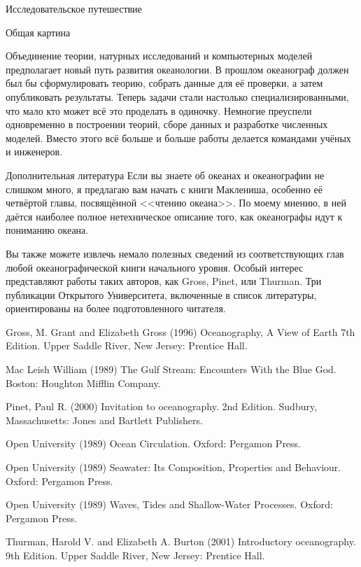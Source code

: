 \begin{chapter}{Исследовательское путешествие}
\begin{section}{Общая картина}

Объединение теории, натурных исследований и компьютерных моделей предполагает 
новый путь развития океанологии. В прошлом океанограф должен был бы сформулировать 
теорию, собрать данные для её проверки, а затем опубликовать результаты. 
Теперь задачи стали настолько специализированными, что мало кто может всё 
это проделать в одиночку. Немногие преуспели одновременно в построении теорий, 
сборе данных и разработке численных моделей. Вместо этого всё больше и больше 
работы делается командами учёных и инженеров.
\end{section}

\begin{section}{Дополнительная литература}
Если вы знаете об океанах и океанографии не слишком много, я предлагаю 
вам начать с книги Маклениша, особенно её четвёртой главы, посвящённой 
<<чтению океана>>. 
По моему мнению, в ней даётся наиболее полное нетехническое описание того, 
как океанографы идут к пониманию океана.

Вы также можете извлечь немало полезных сведений из соответствующих глав любой 
океанографической книги начального уровня. Особый интерес представляют работы 
таких авторов, как Gross, Pinet, или Thurman. Три публикации Открытого 
Университета, включенные в список литературы, ориентированы на более 
подготовленного читателя. 

Gross, M. Grant and Elizabeth Gross (1996) Oceanography, 
A View of Earth 7th Edition. Upper Saddle River, New Jersey: Prentice Hall. 

Mac Leish William (1989) The Gulf Stream: Encounters With the Blue God. 
Boston: Houghton Mifflin Company. 

Pinet, Paul R. (2000) Invitation to oceanography. 2nd Edition. Sudbury, 
Massachusetts: Jones and Bartlett Publishers.

Open University (1989) Ocean Circulation. Oxford: Pergamon Press. 

Open University (1989) Seawater: Its Composition, Properties and Behaviour. 
Oxford: Pergamon Press. 

Open University (1989) Waves, Tides and Shallow-Water Processes. 
Oxford: Pergamon Press. 

Thurman, Harold V. and Elizabeth A. Burton (2001) Introductory oceanography. 
9th Edition. Upper Saddle River, New Jersey: Prentice Hall.
\end{section}

\end{chapter}
